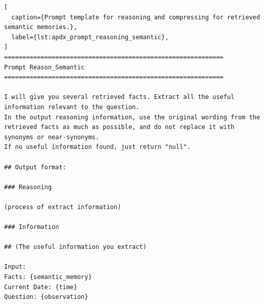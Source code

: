 \begin{lstlisting}[
  caption={Prompt template for reasoning and compressing for retrieved semantic memories.},
  label={lst:apdx_prompt_reasoning_semantic},
]
============================================================
Prompt Reason_Semantic
============================================================

I will give you several retrieved facts. Extract all the useful information relevant to the question.
In the output reasoning information, use the original wording from the retrieved facts as much as possible, and do not replace it with synonyms or near-synonyms.
If no useful information found, just return "null".

## Output format:

### Reasoning

(process of extract information)

### Information

## (The useful information you extract)

Input:
Facts: {semantic_memory}
Current Date: {time}
Question: {observation}
\end{lstlisting}
